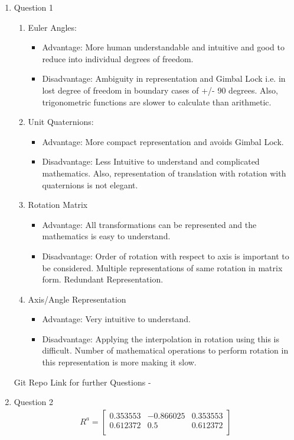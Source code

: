 \documentclass[paper=a4, fontsize=11pt]{scrartcl} %
\numberwithin{equation}{section} %
\numberwithin{figure}{section} %
\numberwithin{table}{section} %
\begin{document}
\begin{enumerate}
\item Question 1
\begin{enumerate}
\item Euler Angles:
\begin{itemize}
\item Advantage: More human understandable and intuitive and good to reduce into individual degrees of freedom.
\item Disadvantage: Ambiguity in representation and Gimbal Lock i.e. in lost degree of freedom in boundary cases of +/- 90 degrees. Also, trigonometric functions are slower to calculate than arithmetic.
\end{itemize}
\item Unit Quaternions:
\begin{itemize}
\item Advantage: More compact representation and avoids Gimbal Lock.
\item Disadvantage: Less Intuitive to understand and complicated mathematics. Also, representation of translation with rotation with quaternions is not elegant.
\end{itemize}
\item Rotation Matrix
\begin{itemize}
\item Advantage: All transformations can be represented and the mathematics is easy to understand.
\item Disadvantage: Order of rotation with respect to axis is important to be considered. Multiple representations of same rotation in matrix form. Redundant Representation.
\end{itemize}
\item Axis/Angle Representation
\begin{itemize}
\item Advantage: Very intuitive to understand.
\item Disadvantage: Applying the interpolation in rotation using this is difficult. Number of mathematical operations to perform rotation in this representation is more making it slow.
\end{itemize}
\end{enumerate}
Git Repo Link for further Questions - 
\item Question 2
\begin{align}
R^{a} = 
\begin{bmatrix}
0.353553 &-0.866025  &0.353553 \\
0.612372  &0.5  &0.612372 \\

\end{bmatrix}
\end{align}
\end{enumerate}
\end{document}
